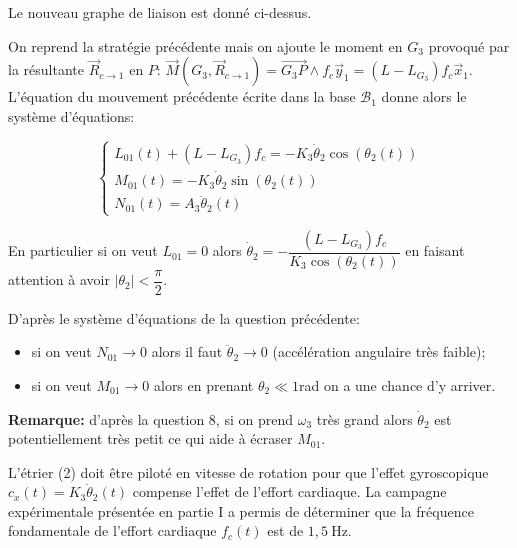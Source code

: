 \begin{corrige}
Le nouveau graphe de liaison est donné ci-dessus.

On reprend la stratégie précédente mais on ajoute le moment en $G_3$ provoqué par la résultante $\overrightarrow{R}_{c \to 1}$ en $P$: $\overrightarrow{M}\left(G_3,\overrightarrow{R}_{c \to 1}\right) = \overrightarrow{G_3 P} \wedge f_c\overrightarrow{y}_1 = (L - L_{G_3})f_c \overrightarrow{x}_1$. L'équation du mouvement précédente écrite dans la base $\mathcal{B}_1$ donne alors le système d'équations:

$$
\left\{
\begin{array}{ll}
L_{01}(t) + (L - L_{G_3})f_c = - K_3\dot{\theta}_2 \cos(\theta_2(t)) \\
M_{01}(t) = - K_3\dot{\theta}_2 \sin(\theta_2(t)) \\
N_{01}(t) = A_3 \ddot{\theta}_2(t)
\end{array}
\right.
$$

En particulier si on veut $L_{01} = 0$ alors $\boxed{\dot{\theta}_2 = - \dfrac{(L - L_{G_3})f_c}{K_3\cos(\theta_2(t))}}$ en faisant attention à avoir $|\theta_2| < \dfrac{\pi}{2}$.
 

\end{corrige}
\else
\fi

\ifprof
\begin{corrige}
D'après le système d'équations de la question précédente:
\begin{itemize}
\item si on veut $N_{01} \to 0$ alors il faut $\ddot{\theta}_2 \to 0$ (accélération angulaire très faible);
\item si on veut $M_{01} \to 0$ alors en prenant $\theta_2 \ll 1$rad on a une chance d'y arriver.
\end{itemize} 

\textbf{Remarque:} d'après la question 8, si on prend $\omega_3$ très grand alors $\dot{\theta}_2$ est potentiellement très petit ce qui aide à \og écraser \fg{} $M_{01}$.
\end{corrige}
\else
\fi

\ifprof
\else
L'étrier (2) doit être piloté en vitesse de rotation pour que l'effet gyroscopique $c_{x}(t)=K_{3} \dot{\theta}_{2}(t)$ compense l'effet de l'effort cardiaque. La campagne expérimentale présentée en partie I a permis de déterminer que la fréquence fondamentale de l'effort cardiaque $f_{c}(t)$ est de $1,5 \mathrm{~Hz}$.


